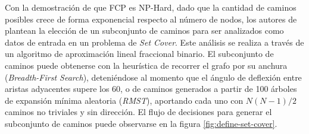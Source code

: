 Con la demostraci\'on de que FCP es NP-Hard, dado que la cantidad de caminos posibles crece de forma exponencial respecto al n\'umero de nodos, los autores de \cite{breuer2015define} plantean la elecci\'on de un subconjunto de caminos para ser analizados como datos de entrada en un problema de {\it Set Cover}. Este an\'alisis se realiza a trav\'es de un algoritmo de aproximaci\'on lineal fraccional binario. El subconjunto de caminos puede obtenerse con la heur\'istica de recorrer el grafo por su anchura ({\it Breadth-First Search}), deteni\'endose al momento que el \'angulo de deflexi\'on entre aristas adyacentes supere los 60\degree, o de caminos generados a partir de 100 \'arboles de expansi\'on m\'inima aleatoria ({\it RMST}), aportando cada uno con $N(N-1)/2$ caminos no triviales y sin direcci\'on. El flujo de decisiones para generar el subconjunto de caminos puede observarse en la figura \ref{fig:define-set-cover}.

